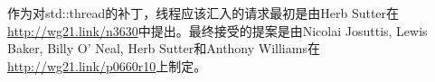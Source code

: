 

作为对std::thread的补丁，线程应该汇入的请求最初是由Herb Sutter在\url{http://wg21.link/n3630}中提出。最终接受的提案是由Nicolai Josuttis, Lewis Baker, Billy O' Neal, Herb Sutter和Anthony Williams在\url{http://wg21.link/p0660r10}上制定。